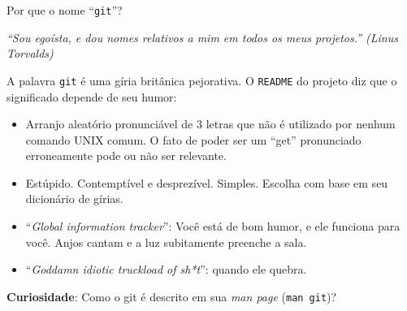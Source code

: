 \documentclass[utf8]{beamer}
\begin{document}
\begin{frame}{Por que o nome ``\texttt{git}''?}
  \begin{adjustwidth}{2em}{1em}\emph{\Large
    ``Sou egoísta, e dou nomes relativos a mim
      em todos os meus projetos.'' (Linus Torvalds)
  }\end{adjustwidth}%
  \vfill%
  A palavra \texttt{git} é uma gíria britânica pejorativa.
  O \texttt{README} do projeto diz que o significado
  depende de seu humor:
  \begin{itemize}
    \item
      Arranjo aleatório pronunciável de 3 letras
      que não é utilizado por nenhum comando UNIX comum.
      O fato de poder ser um ``get'' pronunciado erroneamente
      pode ou não ser relevante.
    \item
      Estúpido. Contemptível e desprezível. Simples.
      Escolha com base em seu dicionário de gírias.
    \item
      ``\emph{Global information tracker}'':
      Você está de bom humor, e ele funciona para você.
      Anjos cantam e a luz subitamente preenche a sala.
    \item
      ``\emph{Goddamn idiotic truckload of sh*t}'': quando ele quebra.
  \end{itemize}
  \vfill%
  \textbf{Curiosidade}:
  Como o git é descrito em sua \emph{man page} (\texttt{man git})?
\end{frame}
\end{document}
